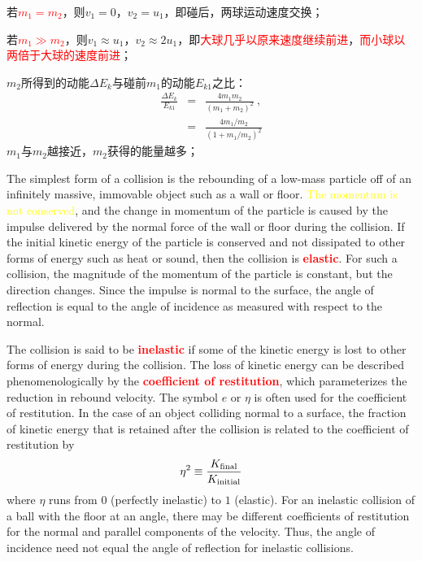 \documentclass[12pt,a4paper]{article}
\begin{document}
若\textcolor{red}{$m_1 = m_2$}，则$v_1 = 0$，$v_2 = u_1$，即碰后，两球运动速度交换；

若\textcolor{red}{$m_1 \gg m_2$}，则$v_1 \approx u_1$，$v_2 \approx 2u_1$，即\textcolor{red}{大球几乎以原来速度继续前进}，\textcolor{red}{而小球以两倍于大球的速度前进}；

$m_2$所得到的动能$\Delta E_k$与碰前$m_1$的动能$E_{k1}$之比：
\begin{eqnarray}
\nonumber \frac{\Delta E_k}{E_{k1}} &=& \frac{4m_1 m_2}{(m_1 +m_2)^2} ~, \\
&=& \frac{4m_1/m_2}{(1+m_1/m_2)^2}
\end{eqnarray}
$m_1$与$m_2$越接近，$m_2$获得的能量越多；


\cite{benacquista2018classical} The simplest form of a collision is the rebounding of a low-mass particle off of an infinitely massive, immovable object such as a wall or floor. \textcolor{yellow}{The momentum is not conserved}, and the change in momentum of the particle is caused by the impulse delivered by the normal force of the wall or floor during the collision. If the initial kinetic energy of the particle is conserved and not dissipated to other forms of energy such as heat or sound, then the collision is \textcolor{red}{\bf elastic}. For such a collision, the magnitude of the momentum of the particle is constant, but the direction changes. Since the impulse is normal to the surface, the angle of reflection is equal to the angle of incidence as measured with respect to the normal.

The collision is said to be \textcolor{red}{\bf inelastic} if some of the kinetic energy is lost to other forms of energy during the collision. The loss of kinetic energy can be described phenomenologically by the \textcolor{red}{\bf coefficient of restitution}, which parameterizes the reduction in rebound velocity. The symbol $e$ or $\eta$ is often used for the coefficient of restitution. In the case of an object colliding normal to a surface, the fraction of kinetic energy that is retained
after the collision is related to the coefficient of restitution by
\begin{equation}
\eta^2 \equiv \dfrac{K_{\rm final}}{K_{\rm initial}}
\end{equation}
where $\eta$ runs from $0$ (perfectly inelastic) to $1$ (elastic). For an inelastic collision of a ball with the floor at an angle, there may be different coefficients of restitution for the normal and parallel components of the velocity. Thus, the angle of incidence need not equal the angle of reflection for inelastic collisions.
\end{document}
